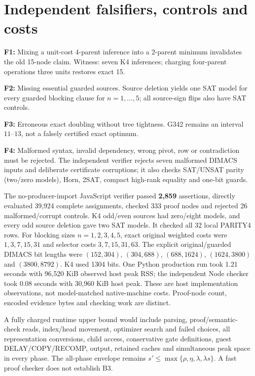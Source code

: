 \documentclass[11pt]{article}
\begin{document}
\section{Independent falsifiers, controls and costs}
\noindent\textbf{F1:} Mixing a unit-cost 4-parent inference into a 2-parent minimum invalidates the old 15-node claim. Witness: seven K4 inferences; charging four-parent operations three units restores exact 15.
\par\noindent\textbf{F2:} Missing essential guarded sources. Source deletion yields one SAT model for every guarded blocking clause for $n=1,\ldots,5$; all source-sign flips also have SAT controls.
\par\noindent\textbf{F3:} Erroneous exact doubling without tree tightness. G342 remains an interval $11$--$13$, not a falsely certified exact optimum.
\par\noindent\textbf{F4:} Malformed syntax, invalid dependency, wrong pivot, row or contradiction must be rejected. The independent verifier rejects seven malformed DIMACS inputs and deliberate certificate corruptions; it also checks SAT/UNSAT parity (two/zero models), Horn, 2SAT, compact high-rank equality and one-bit guards.

The no-producer-import JavaScript verifier passed \textbf{2,859} assertions, directly evaluated 39,924 complete assignments, checked 333 proof nodes and rejected 26 malformed/corrupt controls. K4 odd/even sources had zero/eight models, and every odd source deletion gave two SAT models. It checked all 32 local PARITY4 rows. For blocking sizes $n=1,2,3,4,5$, exact original weighted costs were $1,3,7,15,31$ and selector costs $3,7,15,31,63$. The explicit original/guarded DIMACS bit lengths were $(152,304)$, $(304,688)$, $(688,1624)$, $(1624,3800)$ and $(3800,8792)$. K4 used 1304 bits. One Python production run took 1.21 seconds with 96,520 KiB observed host peak RSS; the independent Node checker took 0.08 seconds with 30,960 KiB host peak. These are host implementation observations, not model-matched native-machine costs. Proof-node count, encoded evidence bytes and checking work are distinct.

A fully charged runtime upper bound would include parsing, proof/semantic-check reads, index/head movement, optimizer search and failed choices, all representation conversions, child access, conservative gate definitions, guest DELAY/COPY/RECOMP, output, retained caches and simultaneous peak space in every phase. The all-phase envelope remains $s'\le\max\{\rho,\eta,\lambda,\lambda s\}$. A fast proof checker does not establish B3.
\end{document}
